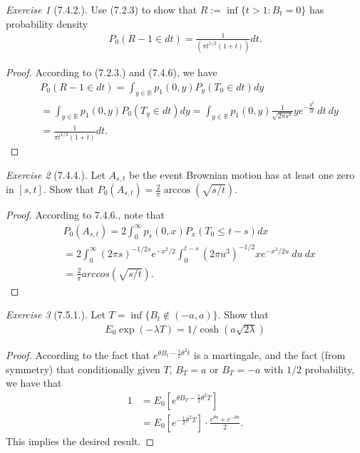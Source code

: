 \documentclass[12pt,a4paper]{amsart}
\theoremstyle{plain}
\theoremstyle{definition}
\theoremstyle{remark}
\newtheorem*{exe}{Exercise}
\numberwithin{equation}{section}
\begin{document}
\begin{exe}[7.4.2.]
Use (7.2.3) to show that $R:= \inf\{t>1: B_t = 0\}$ has probability density
\begin{align}
P_0(R -1\in dt)
= \frac{1}{(\pi t^{1/2}(1+t))} dt.
\end{align}
\end{exe}
\begin{proof}
According to (7.2.3.) and (7.4.6), we have
\begin{align}
&P_0(R-1 \in dt) = \int_{y\in \mathbb R} p_1(0,y) P_y(T_0 \in dt) dy
\\&= \int_{y\in \mathbb R} p_1(0,y) P_0(T_y \in dt) dy
= \int_{y\in \mathbb R} p_1(0,y) \frac{1}{\sqrt{2\pi s^3}} y e^{- \frac{y^2}{2t}}~dt~dy
\\&= \frac{1}{\pi t^{1/2} (1+t)} dt.
\end{align}
\end{proof}
\begin{exe}[7.4.4.]
Let $A_{s,t}$ be the event Brownian motion has at least one zero in $[s,t]$. 
Show that $P_0(A_{s,t}) = \frac{2}{\pi} \arccos(\sqrt{s/t})$.
\end{exe}
\begin{proof}
According to 7.4.6., note that 
  \begin{align}
&P_0(A_{s,t}) 
= 2\int_0^\infty p_s(0,x) P_x(T_0 \leq t-s) dx
    \\&=2\int_0^\infty (2\pi s)^{-1/2s} e^{- x^2/2} \int_0^{t-s} (2\pi u^3)^{-1/2} x e^{-x^2/2u}~du~dx
\\&= \frac{2}{\pi} arccos(\sqrt{s/t}).
  \end{align}
\end{proof}
\begin{exe}[7.5.1.]
  Let $T = \inf\{B_t \not\in (-a,a)\}.$ Show that
  \begin{align}
    E_0 \exp(-\lambda T) 
    = 1/ \cosh(a \sqrt{2\lambda})
\end{align}
\end{exe}
\begin{proof}
According to the fact that $e^{\theta B_t - \frac{1}{2} \theta^2 t}$ is a martingale, and the fact (from symmetry) that conditionally given $T$, $B_T = a$ or $B_T = -a$ with $1/2$ probability, we have that
\begin{align}
  1 &= E_0\left[ e^{\theta B_T - \frac{1}{2} \theta^2 T} \right]
  \\&= E_0\left[ e^{-\frac{1}{2}\theta^2 T} \right] \cdot \frac{e^{\theta a} + e^{-\theta a}}{2}.
\end{align}
This implies the desired result.
\end{proof}
\end{document}
